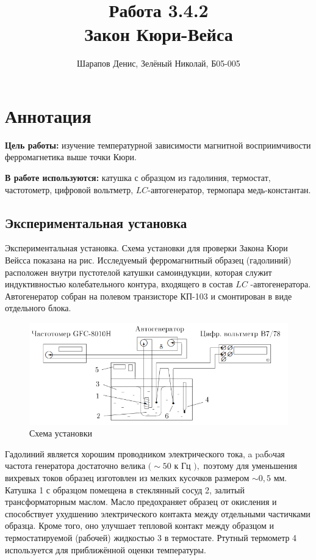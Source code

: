 \documentclass[a4paper]{article}
\title{Работа 3.4.2 \\ Закон Кюри-Вейса}
\author{Шарапов Денис, Зелёный Николай, Б05-005}
\date{}
\theoremstyle{definition}
\theoremstyle{remark}
\begin{document}
    \maketitle
    \tableofcontents
    \newpage
    
\section{Аннотация}

\noindent\textbf{Цель работы:} изучение температурной зависимости магнитной восприимчивости ферромагнетика выше точки Кюри. \medskip
 
\noindent \textbf{В работе используются:} катушка с образцом из гадолиния, термостат, частотометр, цифровой вольтметр, $LC$-автогенератор, термопара медь-константан.

\subsection{Экспериментальная установка}

Экспериментальная установка. Схема установки для проверки Закона Кюри Вейсса показана на рис. Исследуемый ферромагнитный образец (гадолиний) расположен внутри пустотелой катушки самоиндукции, которая служит индуктивностью колебательного контура, входящего в состав $L C$ -автогенератора. Автогенератор собран на полевом транзисторе КП-103 и смонтирован в виде отдельного блока.

\begin{figure}[h!]
    \centering
    \includegraphics[width=\linewidth]{image/1.png}
    \caption{Схема установки}
\end{figure}

\noindent Гадолиний является хорошим проводником электрического тока, a paбoчая частота генератора достаточно велика $(\sim 50$ к Гц $),$ поэтому для уменьшения вихревых токов образец изготовлен из мелких кусочков размером $\sim 0,5$ мм. Катушка 1 с образцом помещена в стеклянный сосуд 2, залитый трансформаторным маслом. Масло предохраняет образец от окисления и способствует
ухудшению электрического контакта между отдельными частичками образца. Кроме того, оно улучшает тепловой контакт между образцом и термостатируемой (рабочей) жидкостью 3 в термостате. Ртутный термометр 4 используется для приближённой оценки температуры. \medskip
\end{document}
